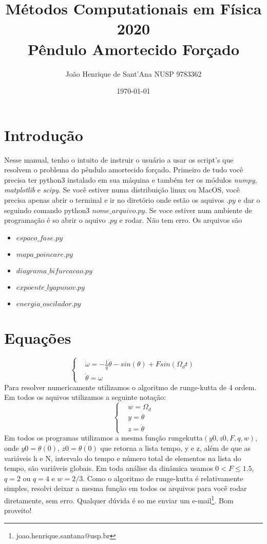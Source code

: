 \documentclass[a4paper,11pt]{article}
\date{\today}
\title{Métodos Computationais em Física 2020\\ Pêndulo Amortecido Forçado} %
\author{João Henrique de Sant'Ana  NUSP 9783362} %
\begin{document}
  

\maketitle
\section*{Introdução}
Nesse manual, tenho o intuito de instruir o usuário a usar os script's que resolvem o problema do pêndulo amortecido forçado. Primeiro de tudo você precisa ter python3 instalado em sua máquina e também ter os módulos \textit{numpy}, \textit{matplotlib} e \textit{scipy}. Se você estiver numa distribuição linux ou MacOS, você precisa apenas abrir o terminal e ir no diretório onde estão os aquivos $.py$ e dar o seguindo comando python3 $nome\_arquivo.py$. Se voce estiver num ambiente de programação é so abrir o aquivo $.py$ e rodar. Não tem erro. Os arquivos são
\begin{itemize}
	\item $espaco\_fase.py$
	\item $mapa\_poincare.py$
	\item $diagrama\_bifurcacao.py$
	\item $expoente\_lyapunov.py$
	\item $energia\_oscilador.py$
\end{itemize}
\section*{Equações}
 \begin{equation}\label{eq:equação_pêndulo_numerica}
        \begin{cases}
        &\dot{\omega}= -\frac{1}{q}\dot{\theta} -sin(\theta) + Fsin(\Omega_{d}t)\\
        &\dot{\theta}=\omega
        \end{cases}
    \end{equation}  
Para resolver numericamente utilizamos o algoritmo de runge-kutta de 4 ordem. Em todos os aquivos utilizamos a seguinte notação:
\begin{equation}\label{eq:notação}
        \begin{cases}
        & w = \Omega_{d}\\
        & y = \theta\\
        & z = \dot{\theta}
        \end{cases}
\end{equation}
Em todos os programas utilizamos a mesma função rungekutta$(y0,z0,F,q,w)$, onde $y0=\theta(0)$, $z0=\dot{\theta(0)}$ que retorna a lista tempo, y e z, além de que as variáveis h e N, intervalo do tempo e número total de elementos na lista do tempo, são variáveis globais. Em toda análise da dinâmica usamos $0<F\leq1.5$, $q=2$ ou $q=4$ e $w=2/3$. Como o algoritmo de runge-kutta é relativamente simples, resolvi deixar a mesma função em todos os arquivos para você rodar diretamente, sem erro. Qualquer dúvida é so me enviar um e-mail\footnote{joao.henrique.santana@usp.br}. Bom proveito!
\end{document}
